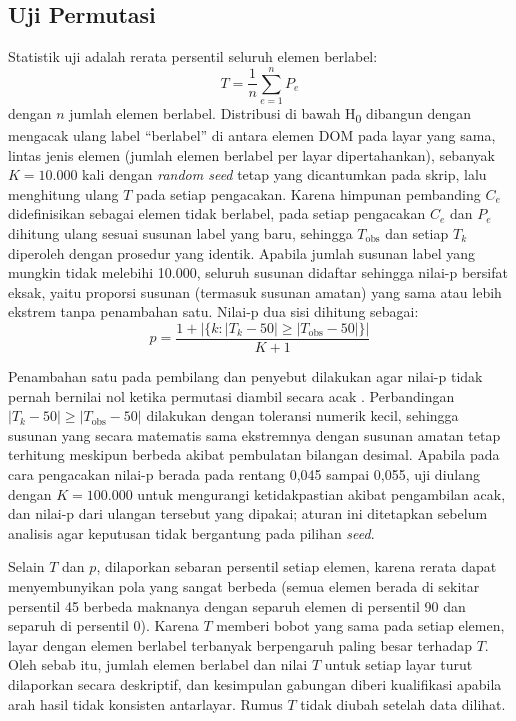 \subsection{Uji Permutasi}
\label{subsec:permutasi}

Statistik uji adalah rerata persentil seluruh elemen berlabel:
\begin{equation}
  T = \frac{1}{n}\sum_{e=1}^{n} P_e
  \label{eq:statistik-t}
\end{equation}
dengan $n$ jumlah elemen berlabel. Distribusi di bawah H\textsubscript{0} dibangun dengan mengacak ulang label ``berlabel'' di antara elemen DOM pada layar yang sama, lintas jenis elemen (jumlah elemen berlabel per layar dipertahankan), sebanyak $K = 10.000$ kali dengan \emph{random seed} tetap yang dicantumkan pada skrip, lalu menghitung ulang $T$ pada setiap pengacakan. Karena himpunan pembanding $C_e$ didefinisikan sebagai elemen tidak berlabel, pada setiap pengacakan $C_e$ dan $P_e$ dihitung ulang sesuai susunan label yang baru, sehingga $T_{\text{obs}}$ dan setiap $T_k$ diperoleh dengan prosedur yang identik. Apabila jumlah susunan label yang mungkin tidak melebihi 10.000, seluruh susunan didaftar sehingga nilai-p bersifat eksak, yaitu proporsi susunan (termasuk susunan amatan) yang sama atau lebih ekstrem tanpa penambahan satu. Nilai-p dua sisi dihitung sebagai:
\begin{equation}
  p = \frac{1 + \left|\{k : |T_k - 50| \geq |T_{\text{obs}} - 50|\}\right|}{K+1}
  \label{eq:nilai-p}
\end{equation}

Penambahan satu pada pembilang dan penyebut dilakukan agar nilai-p tidak pernah bernilai nol ketika permutasi diambil secara acak \citep{phipson2010permutation}. Perbandingan $|T_k - 50| \geq |T_{\text{obs}} - 50|$ dilakukan dengan toleransi numerik kecil, sehingga susunan yang secara matematis sama ekstremnya dengan susunan amatan tetap terhitung meskipun berbeda akibat pembulatan bilangan desimal. Apabila pada cara pengacakan nilai-p berada pada rentang 0,045 sampai 0,055, uji diulang dengan $K = 100.000$ untuk mengurangi ketidakpastian akibat pengambilan acak, dan nilai-p dari ulangan tersebut yang dipakai; aturan ini ditetapkan sebelum analisis agar keputusan tidak bergantung pada pilihan \emph{seed}.

Selain $T$ dan $p$, dilaporkan sebaran persentil setiap elemen, karena rerata dapat menyembunyikan pola yang sangat berbeda (semua elemen berada di sekitar persentil 45 berbeda maknanya dengan separuh elemen di persentil 90 dan separuh di persentil 0). Karena $T$ memberi bobot yang sama pada setiap elemen, layar dengan elemen berlabel terbanyak berpengaruh paling besar terhadap $T$. Oleh sebab itu, jumlah elemen berlabel dan nilai $T$ untuk setiap layar turut dilaporkan secara deskriptif, dan kesimpulan gabungan diberi kualifikasi apabila arah hasil tidak konsisten antarlayar. Rumus $T$ tidak diubah setelah data dilihat.

